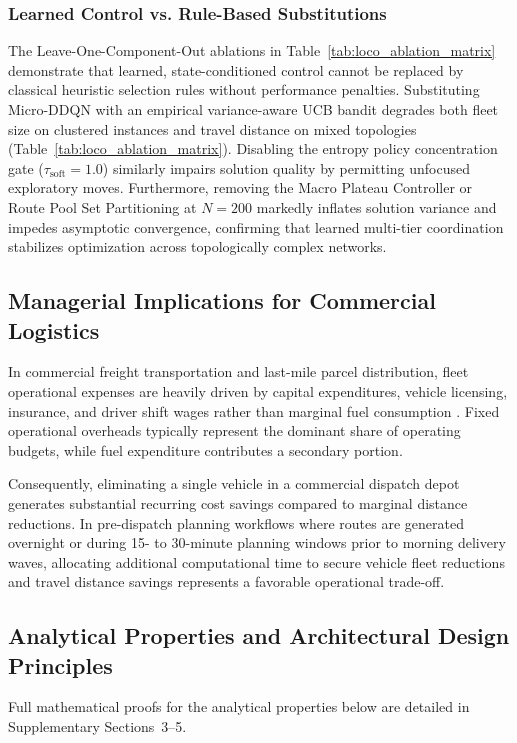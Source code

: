 \documentclass{ieeeaccess}
\begin{document}
\subsubsection{Learned Control vs. Rule-Based Substitutions}
\label{sec:disc_rule_vs_learned}
The Leave-One-Component-Out ablations in Table~\ref{tab:loco_ablation_matrix} demonstrate that learned, state-conditioned control cannot be replaced by classical heuristic selection rules without performance penalties. Substituting Micro-DDQN with an empirical variance-aware UCB bandit degrades both fleet size on clustered instances and travel distance on mixed topologies (Table~\ref{tab:loco_ablation_matrix}). Disabling the entropy policy concentration gate ($\tau_{\text{soft}}=1.0$) similarly impairs solution quality by permitting unfocused exploratory moves. Furthermore, removing the Macro Plateau Controller or Route Pool Set Partitioning at $N=200$ markedly inflates solution variance and impedes asymptotic convergence, confirming that learned multi-tier coordination stabilizes optimization across topologically complex networks.

\subsection{Managerial Implications for Commercial Logistics}
\label{sec:disc_managerial}

In commercial freight transportation and last-mile parcel distribution, fleet operational expenses are heavily driven by capital expenditures, vehicle licensing, insurance, and driver shift wages rather than marginal fuel consumption \cite{Toth2014, braysy2005vehicle}. Fixed operational overheads typically represent the dominant share of operating budgets, while fuel expenditure contributes a secondary portion.

Consequently, eliminating a single vehicle in a commercial dispatch depot generates substantial recurring cost savings compared to marginal distance reductions. In pre-dispatch planning workflows where routes are generated overnight or during 15- to 30-minute planning windows prior to morning delivery waves, allocating additional computational time to secure vehicle fleet reductions and travel distance savings represents a favorable operational trade-off.

\subsection{Analytical Properties and Architectural Design Principles}
\label{sec:disc_theory}
Full mathematical proofs for the analytical properties below are detailed in Supplementary Sections~3--5.
\end{document}
